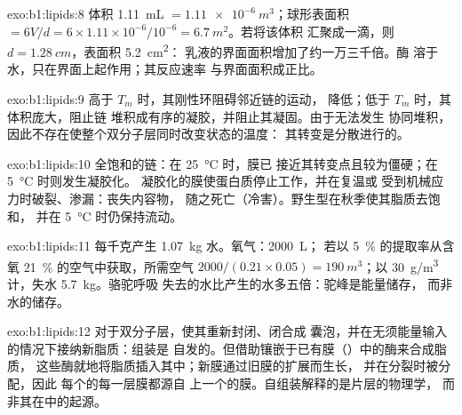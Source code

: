 \begin{solution}{exo:b1:lipids:8}
体积 \qty{1.11}{mL} $= \qty{1.11e-6}{m^3}$；球形表面积
$= 6V/d = 6\times 1.11\times 10^{-6}/10^{-6} = \qty{6.7}{m^2}$。若将该体积
汇聚成一滴，则 $d = \qty{1.28}{cm}$，表面积 \qty{5.2}{cm^2}：
乳液的界面面积增加了约一万三千倍。酶
溶于水，只在界面上起作用；其反应速率
与界面面积成正比。
\end{solution}

\begin{solution}{exo:b1:lipids:9}
高于 $T_m$ 时，其刚性环阻碍邻近链的运动，
降低；低于 $T_m$ 时，其体积庞大，阻止链
堆积成有序的凝胶，并阻止其凝固。由于无法发生
协同堆积，因此不存在使整个双分子层同时改变状态的温度：
其转变是分散进行的。
\end{solution}

\begin{solution}{exo:b1:lipids:10}
全饱和的链：在 \qty{25}{\celsius} 时，膜已
接近其转变点且较为僵硬；在 \qty{5}{\celsius} 时则发生凝胶化。
凝胶化的膜使蛋白质停止工作，并在复温或
受到机械应力时破裂、渗漏：丧失内容物，
随之死亡（冷害）。野生型在秋季使其脂质去饱和，
并在 \qty{5}{\celsius} 时仍保持流动。
\end{solution}

\begin{solution}{exo:b1:lipids:11}
每千克产生 \qty{1.07}{kg} 水。氧气：\qty{2000}{L}；
若以 \qty{5}{\%} 的提取率从含氧 \qty{21}{\%} 的空气中获取，所需空气
$2000/(0.21\times 0.05) = \qty{190}{m^3}$；以
\qty{30}{g/m^3}计，失水 \qty{5.7}{kg}。骆驼呼吸
失去的水比产生的水多五倍：驼峰是能量储存，
而非水的储存。
\end{solution}

\begin{solution}{exo:b1:lipids:12}
对于双分子层，使其重新封闭、闭合成
囊泡，并在无须能量输入的情况下接纳新脂质：组装是
自发的。但借助镶嵌于已有膜（）中的酶来合成脂质，
这些酶就地将脂质插入其中；新膜通过旧膜的扩展而生长，
并在分裂时被分配，因此
每个的每一层膜都源自
上一个的膜。自组装解释的是片层的物理学，
而非其在中的起源。
\end{solution}

